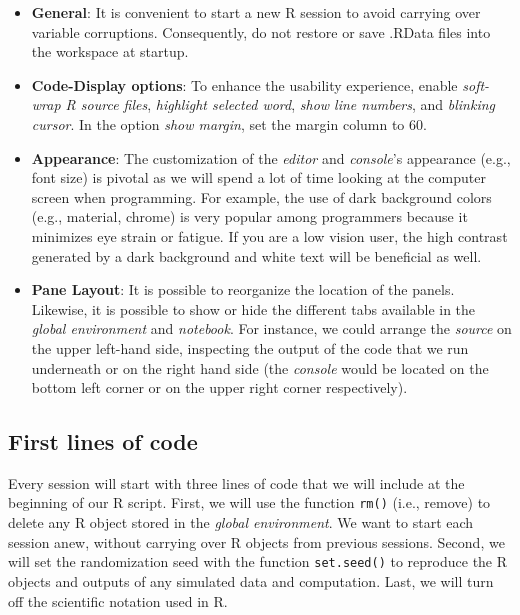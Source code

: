 \documentclass[
]{book}
\theoremstyle{definition}
\theoremstyle{definition}
\theoremstyle{definition}
\theoremstyle{definition}
\theoremstyle{remark}
\begin{document}
\begin{itemize}
\item
  \textbf{General}: It is convenient to start a new R session to avoid carrying over variable corruptions. Consequently, do not restore or save .RData files into the workspace at startup.
\item
  \textbf{Code-Display options}: To enhance the usability experience, enable \emph{soft-wrap R source files}, \emph{highlight selected word}, \emph{show line numbers}, and \emph{blinking cursor}. In the option \emph{show margin}, set the margin column to 60.
\item
  \textbf{Appearance}: The customization of the \emph{editor} and \emph{console}'s appearance (e.g., font size) is pivotal as we will spend a lot of time looking at the computer screen when programming. For example, the use of dark background colors (e.g., material, chrome) is very popular among programmers because it minimizes eye strain or fatigue. If you are a low vision user, the high contrast generated by a dark background and white text will be beneficial as well.
\item
  \textbf{Pane Layout}: It is possible to reorganize the location of the panels. Likewise, it is possible to show or hide the different tabs available in the \emph{global environment} and \emph{notebook}. For instance, we could arrange the \emph{source} on the upper left-hand side, inspecting the output of the code that we run underneath or on the right hand side (the \emph{console} would be located on the bottom left corner or on the upper right corner respectively).
\end{itemize}

\hypertarget{first-lines-of-code}{%
\subsection{First lines of code}\label{first-lines-of-code}}

Every session will start with three lines of code that we will include at the beginning of our R script. First, we will use the function \texttt{rm()} (i.e., remove) to delete any R object stored in the \emph{global environment}. We want to start each session anew, without carrying over R objects from previous sessions. Second, we will set the randomization seed with the function \texttt{set.seed()} to reproduce the R objects and outputs of any simulated data and computation. Last, we will turn off the scientific notation used in R.
\end{document}

